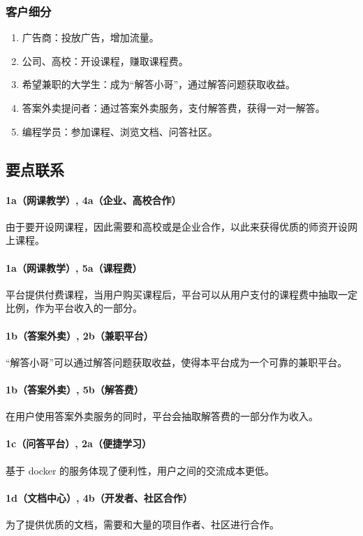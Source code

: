 \documentclass[a4paper]{ctexart}
\begin{document}
\subsubsection{客户细分}

\begin{enumerate}[label=\alph*.]
  \item 广告商：投放广告，增加流量。
  \item 公司、高校：开设课程，赚取课程费。
  \item 希望兼职的大学生：成为“解答小哥”，通过解答问题获取收益。
  \item 答案外卖提问者：通过答案外卖服务，支付解答费，获得一对一解答。
  \item 编程学员：参加课程、浏览文档、问答社区。
\end{enumerate}

\subsection{要点联系}

\paragraph{1a（网课教学）, 4a（企业、高校合作）}由于要开设网课程，因此需要和高校或是企业合作，以此来获得优质的师资开设网上课程。
\paragraph{1a（网课教学）, 5a（课程费）}平台提供付费课程，当用户购买课程后，平台可以从用户支付的课程费中抽取一定比例，作为平台收入的一部分。
\paragraph{1b（答案外卖）, 2b（兼职平台）}“解答小哥”可以通过解答问题获取收益，使得本平台成为一个可靠的兼职平台。
\paragraph{1b（答案外卖）, 5b（解答费）}在用户使用答案外卖服务的同时，平台会抽取解答费的一部分作为收入。
\paragraph{1c（问答平台）, 2a（便捷学习）}基于 docker 的服务体现了便利性，用户之间的交流成本更低。
\paragraph{1d（文档中心）, 4b（开发者、社区合作）}为了提供优质的文档，需要和大量的项目作者、社区进行合作。
\end{document}
